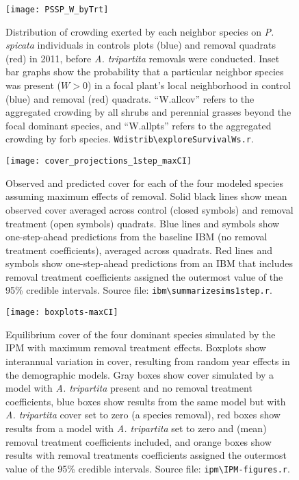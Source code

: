 \documentclass[11pt]{article}
\begin{document}
  \begin{figure}[tbp]
 \centering
 \texttt{[image: PSSP\_W\_byTrt]}
 \caption{Distribution of crowding exerted by each neighbor species on \textit{P. spicata} individuals in controls plots (blue) and removal quadrats (red) in 2011, before \textit{A. tripartita}  removals were conducted. Inset bar graphs show the probability that a particular neighbor species was present ($W>0$) in a focal plant's local neighborhood in control (blue) and removal (red) quadrats. ``W.allcov'' refers to the aggregated crowding by all shrubs and perennial grasses beyond the focal dominant species, and ``W.allpts'' refers to the aggregated crowding by forb species.  \texttt{Wdistrib\textbackslash exploreSurvivalWs.r}. }
 \label{fig:W-by-treatment}
 \end{figure}
 

 \begin{figure}[tbp]
 \centering
 \texttt{[image: cover\_projections\_1step\_maxCI]}
 \caption{Observed and predicted cover for each of the four modeled species assuming maximum effects of removal. 
  Solid black lines show mean observed cover averaged across control (closed symbols) and removal treatment (open symbols) quadrats. Blue lines and symbols show one-step-ahead predictions from the baseline IBM (no removal treatment coefficients), averaged across quadrats. Red lines and symbols show one-step-ahead predictions from an IBM that includes removal treatment coefficients assigned the outermost value of the 95\% credible intervals. 
  Source file: \texttt{ibm\textbackslash summarize\textunderscore sims1step.r}. }
 \label{fig:IBM1step-maxCI}
 \end{figure}
 
  \begin{figure}[tbp]
  \centering
  \texttt{[image: boxplots-maxCI]}
  \caption{Equilibrium cover of the four dominant species simulated by the IPM with maximum removal treatment effects. Boxplots show interannual variation in cover, 
  resulting from random year effects in the demographic models. Gray boxes show cover simulated by a model with \textit{A. tripartita} present and no removal treatment 
  coefficients, blue boxes show results from the same model but with \textit{A. tripartita} cover set to zero (a species removal), red boxes show results from a 
  model with  \textit{A. tripartita} set to zero and (mean) removal treatment coefficients included, and orange boxes show results with removal treatments 
  coefficients assigned the outermost value of the 95\% credible intervals.  Source file: \texttt{ipm\textbackslash IPM-figures.r}.}
  \label{fig:IPMresults-maxCI}
  \end{figure}
\end{document}
